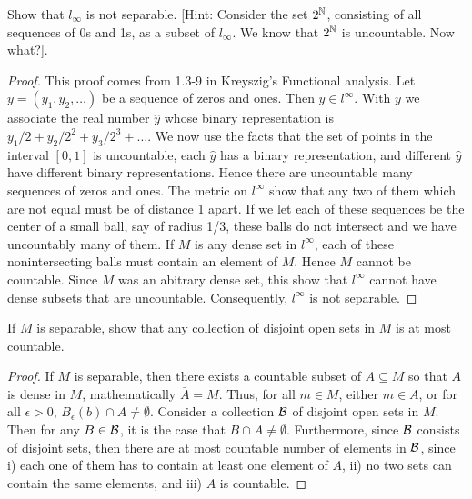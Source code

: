 \begin{exercise}{50}
Show that $l_\infty$ is not separable.
[Hint: Consider the set $2^{\mathbb{N}}$, consisting of all sequences of 0s and 1s, as a subset of $l_\infty$.
We know that $2^{\mathbb{N}}$ is uncountable.
Now what?].
\end{exercise}
\begin{proof}
This proof comes from 1.3-9 in Kreyszig's Functional analysis.
Let $y=(y_1,y_2,\dots)$ be a sequence of zeros and ones.
Then $y\in l^\infty$.
With $y$ we associate the real number $\hat{y}$ whose binary representation is $y_1/2 + y_2/2^2 + y_3/2^3 +\dots$.
We now use the facts that the set of points in the interval $[0,1]$ is uncountable, each $\hat{y}$ has a binary representation, and different $\hat{y}$ have different binary representations.
Hence there are uncountable many sequences of zeros and ones.
The metric on $l^\infty$ show that any two of them which are not equal must be of distance 1 apart.
If we let each of these sequences be the center of a small ball, say of radius 1/3, these balls do not intersect and we have uncountably many of them.
If $M$ is any dense set in $l^\infty$, each of these nonintersecting balls must contain an element of $M$.
Hence $M$ cannot be countable.
Since $M$ was an abitrary dense set, this show that $l^\infty$ cannot have dense subsets that are uncountable.
Consequently, $l^\infty$ is not separable.
\end{proof} 

\begin{exercise}{52}
If $M$ is separable, show that any collection of disjoint open sets in $M$ is at most countable.
\end{exercise}
\begin{proof}
If $M$ is separable, then there exists a countable subset of $A\subseteq M$ so that $A$ is dense in $M$, mathematically $\bar{A}=M$.
Thus, for all $m\in M$, either $m\in A$, or for all $\epsilon>0$, $B_\epsilon(b)\cap A\neq\emptyset$.
Consider a collection $\mathcal{B}$ of disjoint open sets in $M$.
Then for any $B\in \mathcal{B}$, it is the case that $B\cap A\neq\emptyset$. 
Furthermore, since $\mathcal{B}$ consists of disjoint sets, then there are at most countable number of elements in $\mathcal{B}$, since i) each one of them has to contain at least one element of $A$, ii) no two sets can contain the same elements, and iii) $A$ is countable.
\end{proof} 
